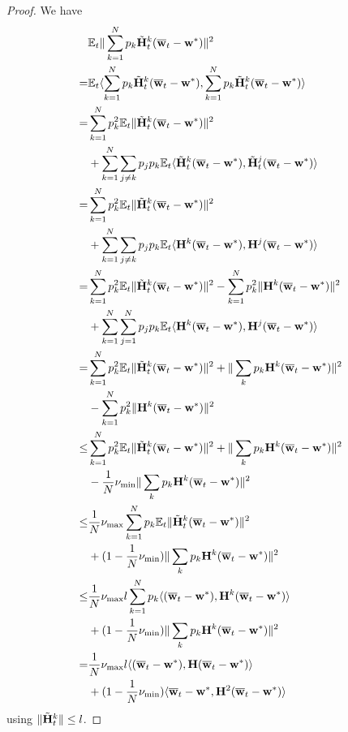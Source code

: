 \begin{proof}
	We have 
	\begin{align*}
	& \mathbb{E}_{t}\|\sum_{k=1}^{N}p_{k}\tilde{{\mathbf{H}}}_{t}^{k}({\overline{\mathbf{w}}}_{t}-{\mathbf{w}}^{\ast})\|^{2}\\
	=&\mathbb{E}_{t}\langle\sum_{k=1}^{N}p_{k}\tilde{{\mathbf{H}}}_{t}^{k}({\overline{\mathbf{w}}}_{t}-{\mathbf{w}}^{\ast}),\sum_{k=1}^{N}p_{k}\tilde{{\mathbf{H}}}_{t}^{k}({\overline{\mathbf{w}}}_{t}-{\mathbf{w}}^{\ast})\rangle\\
	=&\sum_{k=1}^{N}p_{k}^{2}\mathbb{E}_{t}\|\tilde{{\mathbf{H}}}_{t}^{k}({\overline{\mathbf{w}}}_{t}-{\mathbf{w}}^{\ast})\|^{2}\\ 
	&+\sum_{k=1}^{N}\sum_{j\neq k}p_{j}p_{k}\mathbb{E}_{t}\langle\tilde{{\mathbf{H}}}_{t}^{k}({\overline{\mathbf{w}}}_{t}-{\mathbf{w}}^{\ast}),\tilde{{\mathbf{H}}}_{t}^{j}({\overline{\mathbf{w}}}_{t}-{\mathbf{w}}^{\ast})\rangle\\
	=&\sum_{k=1}^{N}p_{k}^{2}\mathbb{E}_{t}\|\tilde{{\mathbf{H}}}_{t}^{k}({\overline{\mathbf{w}}}_{t}-{\mathbf{w}}^{\ast})\|^{2} \\
	& +\sum_{k=1}^{N}\sum_{j\neq k}p_{j}p_{k}\mathbb{E}_{t}\langle {\mathbf{H}}^{k}({\overline{\mathbf{w}}}_{t}-{\mathbf{w}}^{\ast}),{\mathbf{H}}^{j}({\overline{\mathbf{w}}}_{t}-{\mathbf{w}}^{\ast})\rangle\\
	=&\sum_{k=1}^{N}p_{k}^{2}\mathbb{E}_{t}\|\tilde{{\mathbf{H}}}_{t}^{k}({\overline{\mathbf{w}}}_{t}-{\mathbf{w}}^{\ast})\|^{2}-\sum_{k=1}^{N}p_{k}^{2}\|{\mathbf{H}}^{k}({\overline{\mathbf{w}}}_{t}-{\mathbf{w}}^{\ast})\|^{2} \\
	& +\sum_{k=1}^{N}\sum_{j=1}^{N}p_{j}p_{k}\mathbb{E}_{t}\langle {\mathbf{H}}^{k}({\overline{\mathbf{w}}}_{t}-{\mathbf{w}}^{\ast}),{\mathbf{H}}^{j}({\overline{\mathbf{w}}}_{t}-{\mathbf{w}}^{\ast})\rangle\\
	=&\sum_{k=1}^{N}p_{k}^{2}\mathbb{E}_{t}\|\tilde{{\mathbf{H}}}_{t}^{k}({\overline{\mathbf{w}}}_{t}-{\mathbf{w}}^{\ast})\|^{2}+\|\sum_{k}p_{k}{\mathbf{H}}^{k}({\overline{\mathbf{w}}}_{t}-{\mathbf{w}}^{\ast})\|^{2}\\
	&-\sum_{k=1}^{N}p_{k}^{2}\|{\mathbf{H}}^{k}({\overline{\mathbf{w}}}_{t}-{\mathbf{w}}^{\ast})\|^{2}\\
	\leq&\sum_{k=1}^{N}p_{k}^{2}\mathbb{E}_{t}\|\tilde{{\mathbf{H}}}_{t}^{k}({\overline{\mathbf{w}}}_{t}-{\mathbf{w}}^{\ast})\|^{2}+\|\sum_{k}p_{k}{\mathbf{H}}^{k}({\overline{\mathbf{w}}}_{t}-{\mathbf{w}}^{\ast})\|^{2}\\
	&-\frac{1}{N}\nu_{\min}\|\sum_{k}p_{k}{\mathbf{H}}^{k}({\overline{\mathbf{w}}}_{t}-{\mathbf{w}}^{\ast})\|^{2}\\
	\leq&\frac{1}{N}\nu_{\max}\sum_{k=1}^{N}p_{k}\mathbb{E}_{t}\|\tilde{{\mathbf{H}}}_{t}^{k}({\overline{\mathbf{w}}}_{t}-{\mathbf{w}}^{\ast})\|^{2}\\
	& +(1-\frac{1}{N}\nu_{\min})\|\sum_{k}p_{k}{\mathbf{H}}^{k}({\overline{\mathbf{w}}}_{t}-{\mathbf{w}}^{\ast})\|^{2}\\
	\leq&\frac{1}{N}\nu_{\max}l\sum_{k=1}^{N}p_{k}\langle({\overline{\mathbf{w}}}_{t}-{\mathbf{w}}^{\ast}),{\mathbf{H}}^{k}({\overline{\mathbf{w}}}_{t}-{\mathbf{w}}^{\ast})\rangle\\
	& +(1-\frac{1}{N}\nu_{\min})\|\sum_{k}p_{k}{\mathbf{H}}^{k}({\overline{\mathbf{w}}}_{t}-{\mathbf{w}}^{\ast})\|^{2}\\
	=&\frac{1}{N}\nu_{\max}l\langle({\overline{\mathbf{w}}}_{t}-{\mathbf{w}}^{\ast}),{\mathbf{H}}({\overline{\mathbf{w}}}_{t}-{\mathbf{w}}^{\ast})\rangle\\
	&+(1-\frac{1}{N}\nu_{\min})\langle{\overline{\mathbf{w}}}_{t}-{\mathbf{w}}^{\ast},{\mathbf{H}}^{2}({\overline{\mathbf{w}}}_{t}-{\mathbf{w}}^{\ast})\rangle
	\end{align*}
	using $\|\tilde{{\mathbf{H}}}_{t}^{k}\|\leq l$. 
	

\end{proof}
